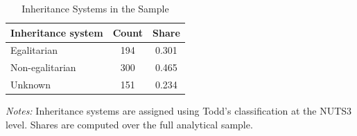 \begin{table}[H]
\centering
\caption{Inheritance Systems in the Sample}
\label{tab:inheritance_composition}

\begin{tablebody}
\begin{tabular}{l c c}
\toprule
\textbf{Inheritance system} & \textbf{Count} & \textbf{Share} \\
\midrule
Egalitarian & 194 & 0.301 \\
Non-egalitarian & 300 & 0.465 \\
Unknown & 151 & 0.234 \\
\bottomrule
\end{tabular}
\end{tablebody}

\vspace{4pt}
\begin{minipage}{\textwidth}
\footnotesize
\textit{Notes:} Inheritance systems are assigned using Todd's classification at the NUTS3 level. Shares are computed over the full analytical sample.
\end{minipage}

\end{table}